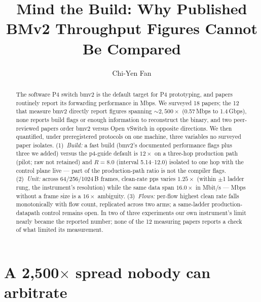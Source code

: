 \documentclass[sigconf,nonacm,anonymous]{acmart}
\begin{document}
\title{Mind the Build: Why Published BMv2 Throughput Figures Cannot Be Compared}

\author{Chi-Yen Fan}

\begin{abstract}
The software P4 switch bmv2 is the default target for P4 prototyping, and
papers routinely report its forwarding performance in Mbps. We surveyed 18
papers; the 12 that measure bmv2 directly report figures spanning
${\sim}2{,}500\times$ (0.57\,Mbps to 1.4\,Gbps), none reports build flags or
enough information to reconstruct the binary, and two peer-reviewed papers
order bmv2 versus Open vSwitch in opposite directions. We then quantified, under preregistered
protocols on one machine, three variables no surveyed paper isolates.
(1)~\emph{Build:} a fast build (bmv2's documented performance flags plus three
we added) versus the p4-guide default is $12\times$ on a three-hop production
path (pilot; raw not retained) and $R{=}8.0$ (interval 5.14--12.0) isolated to
one hop with the control plane live --- part of the production-path ratio is
not the compiler flags. (2)~\emph{Unit:} across 64/256/1024\,B frames,
clean-rate pps varies $1.25\times$ (within $\pm$1 ladder rung, the
instrument's resolution) while the same data span $16.0\times$ in Mbit/s ---
Mbps without a frame size is a $16\times$ ambiguity.
(3)~\emph{Flows:} per-flow highest clean rate falls monotonically with flow
count, replicated across two arms; a same-ladder production-datapath control
remains open. In two of three experiments our own instrument's limit nearly
became the reported number; none of the 12 measuring papers reports a check
of what limited its measurement.
\end{abstract}


\maketitle

\section{A 2,500$\times$ spread nobody can arbitrate}
\end{document}
